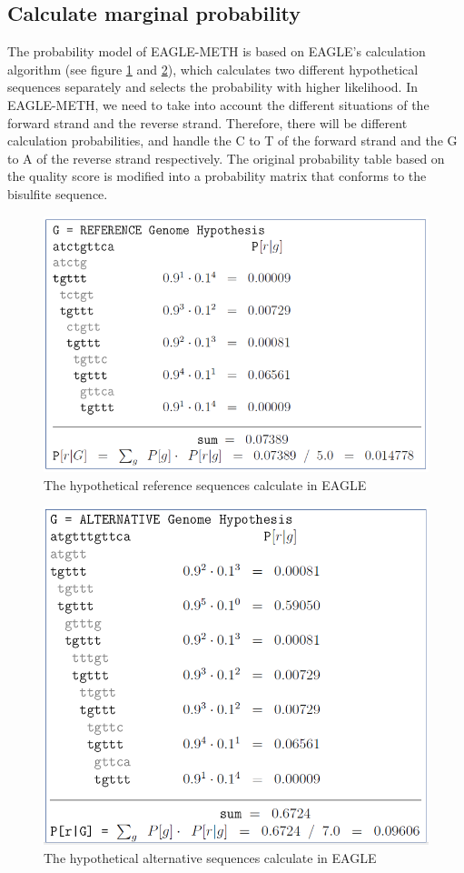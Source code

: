 \documentclass{PHlab-thesis}
\begin{document}
\subsection{Calculate marginal probability}
The probability model of EAGLE-METH is based on EAGLE's calculation algorithm (see figure \ref{fig:ref} and \ref{fig:alt}), which calculates two different hypothetical sequences separately and selects the probability with higher likelihood. In EAGLE-METH, we need to take into account the different situations of the forward strand and the reverse strand. Therefore, there will be different calculation probabilities, and handle the C to T of the forward strand and the G to A of the reverse strand respectively. The original probability table based on the quality score is modified into a probability matrix that conforms to the bisulfite sequence.
\begin{figure}[h!]
  \centering
  \includegraphics[scale=0.8]{figures/ref.PNG}
  \caption{The hypothetical reference sequences calculate in EAGLE}
  \label{fig:ref}
\end{figure}
\begin{figure}[h!]
  \centering
  \includegraphics[scale=0.6]{figures/alter.PNG}
  \caption{The hypothetical alternative sequences calculate in EAGLE}
  \label{fig:alt}
\end{figure}
\end{document}
